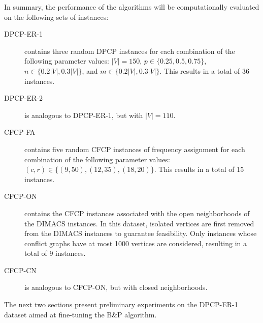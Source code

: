 \documentclass[preprint, 11pt, authoryear]{elsarticle}
\newcommand{\PP}{{\mathcal P}}
\begin{document}
In summary, the performance of the algorithms will be computationally evaluated on the following sets of instances:

\begin{description}
    \item[DPCP-ER-1] contains three random DPCP instances for each combination of the following parameter values: $|V| = 150$, $p \in \{0.25,0.5,0.75\}$, $n \in \{0.2|V|, 0.3|V|\}$, and $m \in \{0.2|V|, 0.3|V|\}$. This results in a total of 36 instances.
    \item[DPCP-ER-2] is analogous to DPCP-ER-1, but with $|V| = 110$.
    \item[CFCP-FA] contains five random CFCP instances of frequency assignment for each combination of the following parameter values: $(c,r) \in \{(9,50),(12,35),(18,20)\}$. This results in a total of 15 instances.
    \item[CFCP-ON] contains the CFCP instances associated with the open neighborhoods of the DIMACS instances. In this dataset, isolated vertices are first removed from the DIMACS instances to guarantee feasibility. Only instances whose conflict graphs have at most 1000 vertices are considered, resulting in a total of 9 instances.
    \item[CFCP-CN] is analogous to CFCP-ON, but with closed neighborhoods.
\end{description}



The next two sections present preliminary experiments on the DPCP-ER-1 dataset aimed at fine-tuning the B\&P algorithm. 
\end{document}
